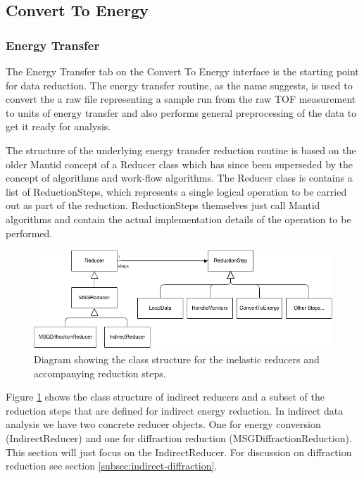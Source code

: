 \documentclass[paper=a4, fontsize=11pt]{scrartcl}	%
\numberwithin{equation}{section}															%
\numberwithin{figure}{section}																%
\numberwithin{table}{section}																%
\begin{document}
\subsection{Convert To Energy}
\subsubsection{Energy Transfer}
\label{sec:energy-transfer}
The Energy Transfer tab on the Convert To Energy interface is the starting point for data reduction. The energy transfer routine, as the name suggests, is used to convert the a raw file representing a sample run from the raw TOF measurement to units of energy transfer and also performs general preprocessing of the data to get it ready for analysis.

The structure of the underlying energy transfer reduction routine is based on the older Mantid concept of a Reducer class which has since been superseded by the concept of algorithms and work-flow algorithms. The Reducer class is contains a list of ReductionSteps, which represents a single logical operation to be carried out as part of the reduction. ReductionSteps themselves just call Mantid algorithms and contain the actual implementation details of the operation to be performed.

\begin{figure}[H]
\centering
\includegraphics[width=1\textwidth]{img/uml/class_diagrams/Reducer_structure.png}
\caption{Diagram showing the class structure for the inelastic reducers and accompanying reduction steps.}
\label{fig:reducer-structure-diagram}
\end{figure}

Figure \ref{fig:reducer-structure-diagram} shows the class structure of indirect reducers and a subset of the reduction steps that are defined for indirect energy reduction. In indirect data analysis we have two concrete reducer objects. One for energy conversion (IndirectReducer) and one for diffraction reduction (MSGDiffractionReduction). This section will just focus on the IndirectReducer. For discussion on diffraction reduction see section \ref{subsec:indirect-diffraction}.
\end{document}
